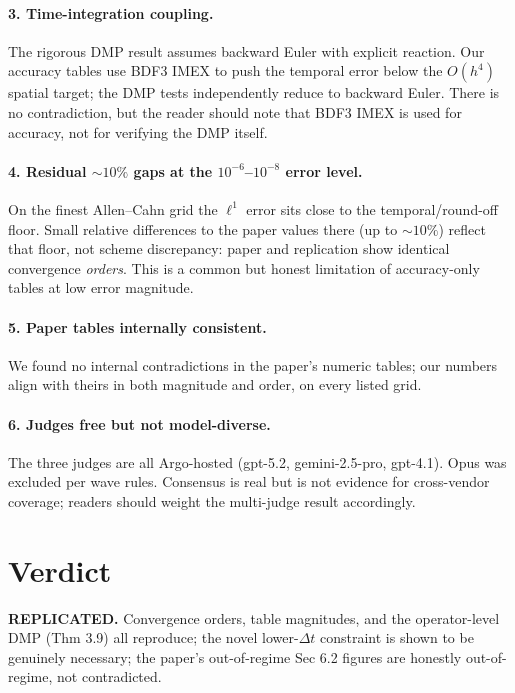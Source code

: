 \documentclass[11pt]{article}
\begin{document}
\paragraph{3. Time-integration coupling.}
The rigorous DMP result assumes backward Euler with explicit reaction. Our accuracy tables use
BDF3 IMEX to push the temporal error below the $O(h^4)$ spatial target; the DMP tests
independently reduce to backward Euler. There is no contradiction, but the reader should note
that BDF3 IMEX is used for accuracy, not for verifying the DMP itself.

\paragraph{4. Residual $\sim 10\%$ gaps at the $10^{-6}$--$10^{-8}$ error level.}
On the finest Allen--Cahn grid the $\ell^1$ error sits close to the temporal/round-off floor.
Small relative differences to the paper values there (up to $\sim 10\%$) reflect that floor, not
scheme discrepancy: paper and replication show identical convergence \emph{orders}. This is a
common but honest limitation of accuracy-only tables at low error magnitude.

\paragraph{5. Paper tables internally consistent.}
We found no internal contradictions in the paper's numeric tables; our numbers align with theirs
in both magnitude and order, on every listed grid.

\paragraph{6. Judges free but not model-diverse.}
The three judges are all Argo-hosted (gpt-5.2, gemini-2.5-pro, gpt-4.1). Opus was excluded per
wave rules. Consensus is real but is not evidence for cross-vendor coverage; readers should
weight the multi-judge result accordingly.

\section*{Verdict}
\textbf{REPLICATED.} Convergence orders, table magnitudes, and the operator-level DMP (Thm 3.9)
all reproduce; the novel lower-$\Delta t$ constraint is shown to be genuinely necessary; the
paper's out-of-regime Sec 6.2 figures are honestly out-of-regime, not contradicted.
\end{document}
